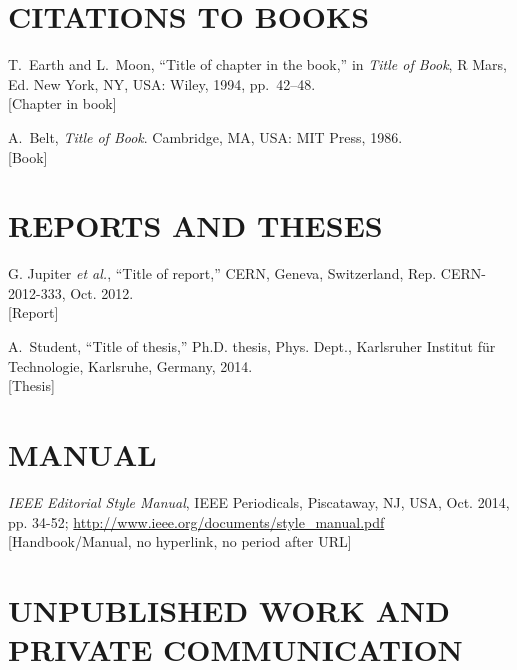 \documentclass[letterpaper,  %
              ]{jacow-2_3}   %
\begin{document}
\section{CITATIONS TO BOOKS}

\begin{thebibliography}{99} %
	\setcounter{enumi}{12}
		T.~Earth and L.~Moon, 
		“Title of chapter in the book,”
		in \emph{Title of Book}, R Mars, Ed. New York, NY, USA: 
		Wiley, 1994, pp.~42--48. \\
	\textcolor{jbook}{[Chapter in book]}
	
		A.~Belt, \emph{Title of Book}. Cambridge, MA, USA: 
		MIT Press, 1986. \\
	\textcolor{jbook}{[Book]}
\end{thebibliography}

\section{REPORTS AND THESES}

\begin{thebibliography}{99} %
	\setcounter{enumi}{14}
		G. Jupiter \emph{et al.}, 
		“Title of report,” CERN, Geneva, Switzerland,
		Rep. CERN-2012-333, Oct. 2012.\\
	\textcolor{jrept}{[Report]}

		A.~Student, “Title of thesis,”
		Ph.D. thesis, Phys. Dept.,
		Karlsruher Institut für Technologie, Karlsruhe, 
		Germany, 2014.\\
	\textcolor{jrept}{[Thesis]}
\end{thebibliography}


\section{MANUAL}

\begin{thebibliography}{99} %
	\setcounter{enumi}{16}
		\emph{IEEE Editorial Style Manual}, 
		IEEE Periodicals, 
		Piscataway, NJ, USA, Oct. 2014, pp. 34-52; 
		\url{http://www.ieee.org/documents/style_manual.pdf} \\
	\textcolor{jmanu}{[Handbook/Manual, no hyperlink, no period after URL]}
\end{thebibliography}


\section{UNPUBLISHED WORK AND PRIVATE COMMUNICATION}
\end{document}
